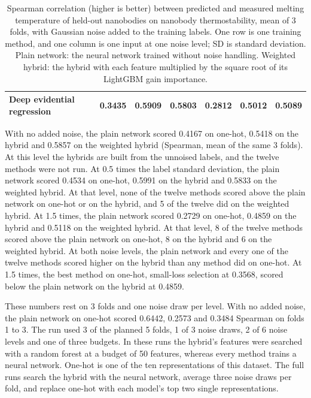 \begin{table}[htbp]
\begin{tabular}{@{}lcccccc@{}}
Deep evidential regression & 0.3435 & 0.5909 & 0.5803 & 0.2812 & 0.5012 & 0.5089 \\
\bottomrule
\end{tabular}
\caption[Methods for learning with noisy labels on nanobody thermostability]{Spearman correlation (higher is better) between predicted and measured melting temperature of held-out nanobodies on nanobody thermostability, mean of 3 folds, with Gaussian noise added to the training labels. One row is one training method, and one column is one input at one noise level; SD is standard deviation. Plain network: the neural network trained without noise handling. Weighted hybrid: the hybrid with each feature multiplied by the square root of its LightGBM gain importance.}
\label{tab:ch6prelim_lnl}
\end{table}

With no added noise, the plain network scored 0.4167 on one-hot, 0.5418 on the hybrid and 0.5857 on the weighted hybrid (Spearman, mean of the same 3 folds). At this level the hybrids are built from the unnoised labels, and the twelve methods were not run. At 0.5 times the label standard deviation, the plain network scored 0.4534 on one-hot, 0.5991 on the hybrid and 0.5833 on the weighted hybrid. At that level, none of the twelve methods scored above the plain network on one-hot or on the hybrid, and 5 of the twelve did on the weighted hybrid. At 1.5 times, the plain network scored 0.2729 on one-hot, 0.4859 on the hybrid and 0.5118 on the weighted hybrid. At that level, 8 of the twelve methods scored above the plain network on one-hot, 8 on the hybrid and 6 on the weighted hybrid. At both noise levels, the plain network and every one of the twelve methods scored higher on the hybrid than any method did on one-hot. At 1.5 times, the best method on one-hot, small-loss selection at 0.3568, scored below the plain network on the hybrid at 0.4859.

These numbers rest on 3 folds and one noise draw per level. With no added noise, the plain network on one-hot scored 0.6442, 0.2573 and 0.3484 Spearman on folds 1 to 3. The run used 3 of the planned 5 folds, 1 of 3 noise draws, 2 of 6 noise levels and one of three budgets. In these runs the hybrid's features were searched with a random forest at a budget of 50 features, whereas every method trains a neural network. One-hot is one of the ten representations of this dataset. The full runs search the hybrid with the neural network, average three noise draws per fold, and replace one-hot with each model's top two single representations.


